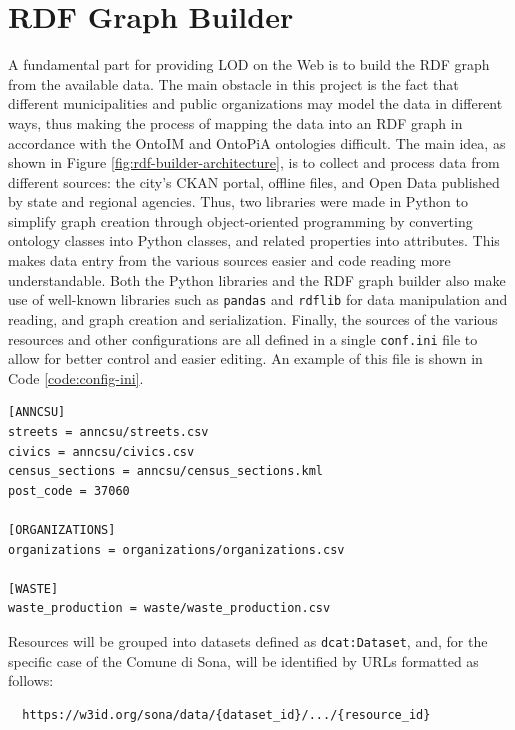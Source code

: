 \chapter{RDF Graph Builder}
\label{chp:rdf-builder}

A fundamental part for providing \acl{LOD} on the Web is to build the \ac{RDF} graph from the available data. The main obstacle in this project is the fact that different municipalities and public organizations may model the data in different ways, thus making the process of mapping the data into an \ac{RDF} graph in accordance with the \ac{OntoIM} and OntoPiA ontologies difficult. The main idea, as shown in Figure \ref{fig:rdf-builder-architecture}, is to collect and process data from different sources: the city's CKAN portal, offline files, and Open Data published by state and regional agencies. Thus, two libraries were made in Python to simplify graph creation through object-oriented programming by converting ontology classes into Python classes, and related properties into attributes. This makes data entry from the various sources easier and code reading more understandable. Both the Python libraries and the \ac{RDF} graph builder also make use of well-known libraries such as \verb#pandas# and \verb#rdflib# for data manipulation and reading, and graph creation and serialization. Finally, the sources of the various resources and other configurations are all defined in a single \verb#conf.ini# file to allow for better control and easier editing. An example of this file is shown in Code \ref{code:config-ini}.

\begin{lstlisting}[caption={Example of a config.ini file that defines sources for some semantic areas.},captionpos=b,label=code:config-ini]
[ANNCSU]
streets = anncsu/streets.csv
civics = anncsu/civics.csv
census_sections = anncsu/census_sections.kml
post_code = 37060

[ORGANIZATIONS]
organizations = organizations/organizations.csv

[WASTE]
waste_production = waste/waste_production.csv
\end{lstlisting}

Resources will be grouped into datasets defined as \verb#dcat:Dataset#, and, for the specific case of the Comune di Sona, will be identified by \acp{URL} formatted as follows:

\begin{verbatim}
  https://w3id.org/sona/data/{dataset_id}/.../{resource_id}
\end{verbatim}

